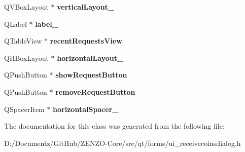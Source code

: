 \begin{DoxyCompactItemize}
Q\+V\+Box\+Layout $\ast$ {\bfseries vertical\+Layout\+\_}
\item 
\mbox{\label{class_ui___receive_coins_dialog_a1c956b26d1d48f5d115a3dbe8a9d29d6}} 
Q\+Label $\ast$ {\bfseries label\+\_}
\item 
\mbox{\label{class_ui___receive_coins_dialog_ad2fab8aafcc546fcf875072618e518cf}} 
Q\+Table\+View $\ast$ {\bfseries recent\+Requests\+View}
\item 
\mbox{\label{class_ui___receive_coins_dialog_a98872fc14e614994974c9c6fc15d11ad}} 
Q\+H\+Box\+Layout $\ast$ {\bfseries horizontal\+Layout\+\_}
\item 
\mbox{\label{class_ui___receive_coins_dialog_ab20161e4cea516779b5a12058c61c9a7}} 
Q\+Push\+Button $\ast$ {\bfseries show\+Request\+Button}
\item 
\mbox{\label{class_ui___receive_coins_dialog_a8b41deec0e153fd5c539678fd620dafd}} 
Q\+Push\+Button $\ast$ {\bfseries remove\+Request\+Button}
\item 
\mbox{\label{class_ui___receive_coins_dialog_a5638ef7d45e6a607922b192eb44e0622}} 
Q\+Spacer\+Item $\ast$ {\bfseries horizontal\+Spacer\+\_}
\end{DoxyCompactItemize}


The documentation for this class was generated from the following file\+:\begin{DoxyCompactItemize}
\item 
D\+:/\+Documentz/\+Git\+Hub/\+Z\+E\+N\+Z\+O-\/\+Core/src/qt/forms/ui\+\_\+receivecoinsdialog.\+h\end{DoxyCompactItemize}
